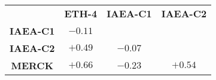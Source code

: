 \begin{tabular}{cccc}
\toprule
& \textbf{ETH-4} & \textbf{IAEA-C1} & \textbf{IAEA-C2} \\
\textbf{IAEA-C1} & $-0.11$\\
\textbf{IAEA-C2} & $+0.49$ & $-0.07$\\
\textbf{MERCK} & $+0.66$ & $-0.23$ & $+0.54$\\
\bottomrule
\end{tabular}